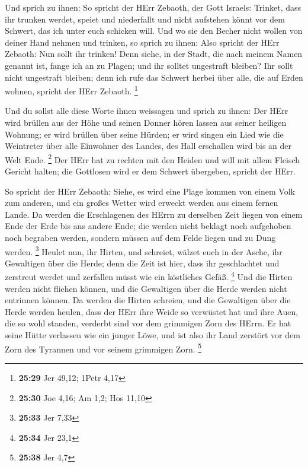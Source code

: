  Und sprich zu ihnen: So spricht der HErr Zebaoth, der Gott
Israels: Trinket, dass ihr trunken werdet, speiet und niederfallt und
nicht aufstehen könnt vor dem Schwert, das ich unter euch schicken will.
 Und wo sie den Becher nicht wollen von deiner Hand nehmen
und trinken, so sprich zu ihnen: Also spricht der HErr Zebaoth: Nun
sollt ihr trinken!  Denn siehe, in der Stadt, die nach
meinem Namen genannt ist, fange ich an zu Plagen; und ihr solltet
ungestraft bleiben? Ihr sollt nicht ungestraft bleiben; denn ich rufe
das Schwert herbei über alle, die auf Erden wohnen, spricht der HErr
Zebaoth. \footnote{\textbf{25:29} Jer 49,12; 1Petr 4,17}

 Und du sollst alle diese Worte ihnen weissagen und sprich
zu ihnen: Der HErr wird brüllen aus der Höhe und seinen Donner hören
lassen aus seiner heiligen Wohnung; er wird brüllen über seine Hürden;
er wird singen ein Lied wie die Weintreter über alle Einwohner des
Landes, des Hall erschallen wird bis an der Welt Ende. \footnote{\textbf{25:30}
  Joe 4,16; Am 1,2; Hos 11,10}  Der HErr hat zu rechten mit
den Heiden und will mit allem Fleisch Gericht halten; die Gottlosen wird
er dem Schwert übergeben, spricht der HErr.

 So spricht der HErr Zebaoth: Siehe, es wird eine Plage
kommen von einem Volk zum anderen, und ein großes Wetter wird erweckt
werden aus einem fernen Lande.  Da werden die Erschlagenen
des HErrn zu derselben Zeit liegen von einem Ende der Erde bis ans
andere Ende; die werden nicht beklagt noch aufgehoben noch begraben
werden, sondern müssen auf dem Felde liegen und zu Dung werden.
\footnote{\textbf{25:33} Jer 7,33}  Heulet nun, ihr Hirten,
und schreiet, wälzet euch in der Asche, ihr Gewaltigen über die Herde;
denn die Zeit ist hier, dass ihr geschlachtet und zerstreut werdet und
zerfallen müsst wie ein köstliches Gefäß. \footnote{\textbf{25:34} Jer
  23,1}  Und die Hirten werden nicht fliehen können, und
die Gewaltigen über die Herde werden nicht entrinnen können.
 Da werden die Hirten schreien, und die Gewaltigen über die
Herde werden heulen, dass der HErr ihre Weide so verwüstet hat
 und ihre Auen, die so wohl standen, verderbt sind vor dem
grimmigen Zorn des HErrn.  Er hat seine Hütte verlassen wie
ein junger Löwe, und ist also ihr Land zerstört vor dem Zorn des
Tyrannen und vor seinem grimmigen Zorn. \footnote{\textbf{25:38} Jer 4,7}

